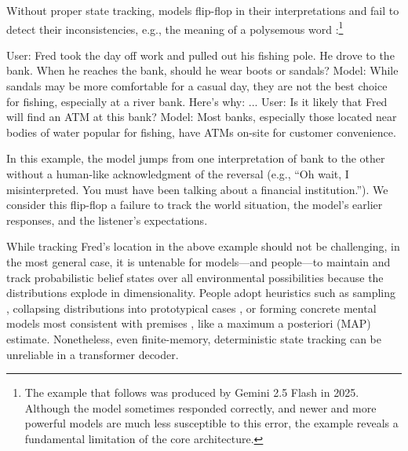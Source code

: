 \documentclass{article}
\begin{document}
Without proper state tracking, models flip-flop in their
interpretations and fail to detect their inconsistencies, e.g.,
the meaning of a polysemous word \citep{lepori2025}:\footnote{The example
that follows was produced by Gemini 2.5 Flash in 2025. Although the model sometimes
responded correctly, and newer and more powerful models are much less susceptible to
this error, the example reveals a fundamental limitation of the core architecture.}
\begin{tcolorbox}[sharp corners, colback=white, colframe=black, fontupper=\ttfamily]
User: Fred took the day off work and pulled out his fishing pole. He drove to the bank. When he reaches the bank, should he wear boots or sandals?\newline
Model: While sandals may be more comfortable for a casual day, they are not the best choice for fishing, especially at a river bank. Here's why: ...\newline
User: Is it likely that Fred will find an ATM at this bank?\newline
Model:  Most banks, especially those located near bodies of water popular for fishing, have ATMs on-site for customer convenience.
\end{tcolorbox}

In this example, the model jumps from one interpretation of bank to the
other without a human-like acknowledgment of the reversal
(e.g., ``Oh wait, I misinterpreted. You must have been talking about a financial institution.''). 
We consider this flip-flop a failure to track the world situation, the model's earlier responses, and the 
listener's expectations.

While tracking Fred's location in the above example should not be challenging, in the most general case,
it is untenable for models---and people---to maintain and track probabilistic belief states over all environmental possibilities because the distributions explode in dimensionality.  People
adopt heuristics such as sampling \citep[e.g.,][]{Vul2014}, collapsing
distributions into prototypical cases \citep{Tversky1971}, or forming concrete
mental models most consistent with premises \citep{johnson1983}, 
like a maximum a posteriori (MAP) estimate. Nonetheless, even finite-memory, deterministic state
tracking can be unreliable in a transformer decoder.
\end{document}
